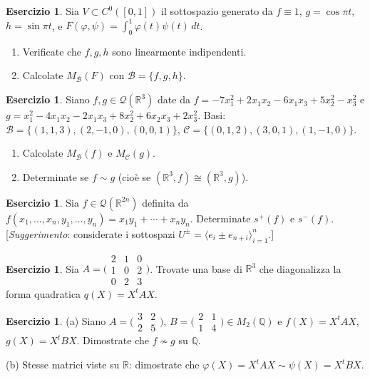 \documentclass[11pt, a4paper]{book}
\theoremstyle{definition}
\newtheorem{esercizio}[definizione]{Esercizio}
\theoremstyle{plain}
\theoremstyle{remark}
\newcommand{\Q}{\mathbb{Q}}
\newcommand{\R}{\mathbb{R}}
\begin{document}
\begin{esercizio}
Sia $V \subset C^0([0,1])$ il sottospazio generato da $f \equiv 1$, $g = \cos\pi t$, $h = \sin\pi t$, e $F(\varphi,\psi) = \int_0^1\varphi(t)\psi(t)\,dt$.
\begin{enumerate}[label=(\arabic*)]
  \item Verificate che $f, g, h$ sono linearmente indipendenti.
  \item Calcolate $M_\mathcal{B}(F)$ con $\mathcal{B} = \{f,g,h\}$.
\end{enumerate}
\end{esercizio}

\begin{esercizio}
Siano $f,g \in \mathcal{Q}(\R^3)$ date da $f = -7x_1^2+2x_1x_2-6x_1x_3+5x_2^2-x_3^2$ e $g = x_1^2-4x_1x_2-2x_1x_3+8x_2^2+6x_2x_3+2x_3^2$. Basi: $\mathcal{B} = \{(1,1,3),(2,-1,0),(0,0,1)\}$, $\mathcal{C} = \{(0,1,2),(3,0,1),(1,-1,0)\}$.
\begin{enumerate}[label=(\arabic*)]
  \item Calcolate $M_\mathcal{B}(f)$ e $M_\mathcal{C}(g)$.
  \item Determinate se $f \sim g$ (cioè se $(\R^3,f) \cong (\R^3,g)$).
\end{enumerate}
\end{esercizio}

\begin{esercizio}
Sia $f \in \mathcal{Q}(\R^{2n})$ definita da $f(x_1,\ldots,x_n,y_1,\ldots,y_n) = x_1y_1+\cdots+x_ny_n$. Determinate $s^+(f)$ e $s^-(f)$. [\emph{Suggerimento}: considerate i sottospazi $U^\pm = \langle e_i \pm e_{n+i}\rangle_{i=1}^n$.]
\end{esercizio}

\begin{esercizio}
Sia $A = \bigl(\begin{smallmatrix}2&1&0\\1&0&2\\0&2&3\end{smallmatrix}\bigr)$. Trovate una base di $\R^3$ che diagonalizza la forma quadratica $q(X) = X^tAX$.
\end{esercizio}

\begin{esercizio}
(a) Siano $A = \bigl(\begin{smallmatrix}3&2\\2&5\end{smallmatrix}\bigr)$, $B = \bigl(\begin{smallmatrix}2&1\\1&4\end{smallmatrix}\bigr) \in M_2(\Q)$ e $f(X)=X^tAX$, $g(X)=X^tBX$. Dimostrate che $f \not\sim g$ su $\Q$.

(b) Stesse matrici viste su $\R$: dimostrate che $\varphi(X) = X^tAX \sim \psi(X) = X^tBX$.
\end{esercizio}
\end{document}
